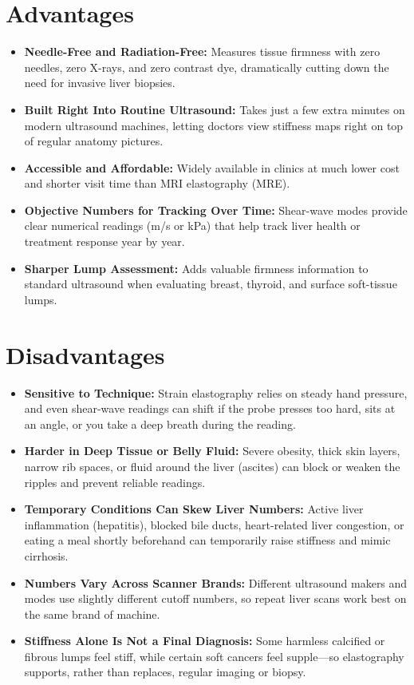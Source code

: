 \section{Advantages}

\begin{itemize}
    \item \textbf{Needle-Free and Radiation-Free:} Measures tissue firmness with zero needles, zero X-rays, and zero contrast dye, dramatically cutting down the need for invasive liver biopsies.
    \item \textbf{Built Right Into Routine Ultrasound:} Takes just a few extra minutes on modern ultrasound machines, letting doctors view stiffness maps right on top of regular anatomy pictures.
    \item \textbf{Accessible and Affordable:} Widely available in clinics at much lower cost and shorter visit time than MRI elastography (MRE).
    \item \textbf{Objective Numbers for Tracking Over Time:} Shear-wave modes provide clear numerical readings (m/s or kPa) that help track liver health or treatment response year by year.
    \item \textbf{Sharper Lump Assessment:} Adds valuable firmness information to standard ultrasound when evaluating breast, thyroid, and surface soft-tissue lumps.
\end{itemize}

\section{Disadvantages}

\begin{itemize}
    \item \textbf{Sensitive to Technique:} Strain elastography relies on steady hand pressure, and even shear-wave readings can shift if the probe presses too hard, sits at an angle, or you take a deep breath during the reading.
    \item \textbf{Harder in Deep Tissue or Belly Fluid:} Severe obesity, thick skin layers, narrow rib spaces, or fluid around the liver (ascites) can block or weaken the ripples and prevent reliable readings.
    \item \textbf{Temporary Conditions Can Skew Liver Numbers:} Active liver inflammation (hepatitis), blocked bile ducts, heart-related liver congestion, or eating a meal shortly beforehand can temporarily raise stiffness and mimic cirrhosis.
    \item \textbf{Numbers Vary Across Scanner Brands:} Different ultrasound makers and modes use slightly different cutoff numbers, so repeat liver scans work best on the same brand of machine.
    \item \textbf{Stiffness Alone Is Not a Final Diagnosis:} Some harmless calcified or fibrous lumps feel stiff, while certain soft cancers feel supple---so elastography supports, rather than replaces, regular imaging or biopsy.
\end{itemize}

